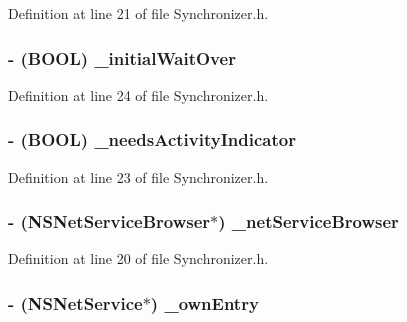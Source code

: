 Definition at line 21 of file Synchronizer.h.

\hypertarget{interface_synchronizer_a576e79a0c313848fb85b32bb52a05cc2}{
\subsubsection[{\_\-initialWaitOver}]{\setlength{\rightskip}{0pt plus 5cm}-\/ (BOOL) {\bf \_\-initialWaitOver}}}
\label{interface_synchronizer_a576e79a0c313848fb85b32bb52a05cc2}


Definition at line 24 of file Synchronizer.h.

\hypertarget{interface_synchronizer_a7580f99fb2c5b18079cb7d0f13b53c37}{
\subsubsection[{\_\-needsActivityIndicator}]{\setlength{\rightskip}{0pt plus 5cm}-\/ (BOOL) {\bf \_\-needsActivityIndicator}}}
\label{interface_synchronizer_a7580f99fb2c5b18079cb7d0f13b53c37}


Definition at line 23 of file Synchronizer.h.

\hypertarget{interface_synchronizer_ac311277b3e40c4b5f5027c113b7766e2}{
\subsubsection[{\_\-netServiceBrowser}]{\setlength{\rightskip}{0pt plus 5cm}-\/ (NSNetServiceBrowser$\ast$) {\bf \_\-netServiceBrowser}}}
\label{interface_synchronizer_ac311277b3e40c4b5f5027c113b7766e2}


Definition at line 20 of file Synchronizer.h.

\hypertarget{interface_synchronizer_acf8e0a71e3a15b64d141cf0387f6a560}{
\subsubsection[{\_\-ownEntry}]{\setlength{\rightskip}{0pt plus 5cm}-\/ (NSNetService$\ast$) {\bf \_\-ownEntry}}}
\label{interface_synchronizer_acf8e0a71e3a15b64d141cf0387f6a560}


